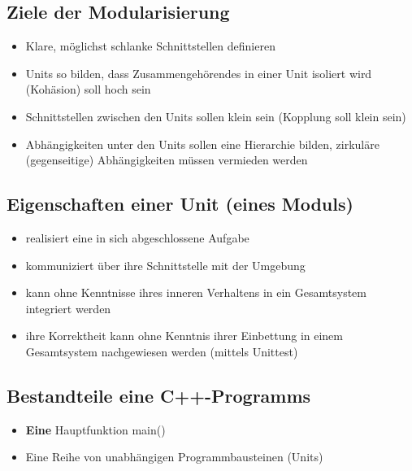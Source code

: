 \subsection{Ziele der Modularisierung}
\label{sec:Ziele der Modularisierung}
\begin{itemize}
	\item Klare, möglichst schlanke Schnittstellen definieren
	\item Units so bilden, dass Zusammengehörendes in einer Unit isoliert wird (Kohäsion) soll hoch sein
	\item Schnittstellen zwischen den Units sollen klein sein (Kopplung soll klein sein)
	\item Abhängigkeiten unter den Units sollen eine Hierarchie bilden, zirkuläre (gegenseitige) Abhängigkeiten müssen vermieden werden
\end{itemize}

\subsection{Eigenschaften einer Unit (eines Moduls)}
\label{sec:Eigenschaften einer Unit (eines Moduls)}
\begin{itemize}
	\item realisiert eine in sich abgeschlossene Aufgabe
	\item kommuniziert über ihre Schnittstelle mit der Umgebung
	\item kann ohne Kenntnisse ihres inneren Verhaltens in ein Gesamtsystem integriert werden
	\item ihre Korrektheit kann ohne Kenntnis ihrer Einbettung in einem Gesamtsystem nachgewiesen werden (mittels Unittest)
\end{itemize}

\subsection{Bestandteile eine C++-Programms}
\label{sec:Bestandteile eine C++-Programms}
\begin{itemize}
	\item \textbf{Eine} Hauptfunktion main()
	\item Eine Reihe von unabhängigen Programmbausteinen (Units)
\end{itemize}

